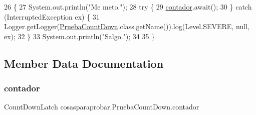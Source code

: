 \begin{DoxyCode}
26     \{
27         System.out.println(\textcolor{stringliteral}{"Me meto."});
28         \textcolor{keywordflow}{try} \{
29             \mbox{\hyperlink{classcosasparaprobar_1_1_prueba_count_down_a94e899bc1667541a563b159ff8d5229e}{contador}}.await();
30         \} \textcolor{keywordflow}{catch} (InterruptedException ex) \{
31             Logger.getLogger(\mbox{\hyperlink{classcosasparaprobar_1_1_prueba_count_down_a89832a2fb0a7768fdd9541cfca2508bf}{PruebaCountDown}}.class.getName()).log(Level.SEVERE, null, ex);
32         \}
33         System.out.println(\textcolor{stringliteral}{"Salgo."});
34         
35     \}
\end{DoxyCode}


\subsection{Member Data Documentation}
\mbox{\label{classcosasparaprobar_1_1_prueba_count_down_a94e899bc1667541a563b159ff8d5229e}} 
\subsubsection{\texorpdfstring{contador}{contador}}
{\footnotesize\ttfamily Count\+Down\+Latch cosasparaprobar.\+Prueba\+Count\+Down.\+contador\hspace{0.3cm}{\ttfamily [package]}}

